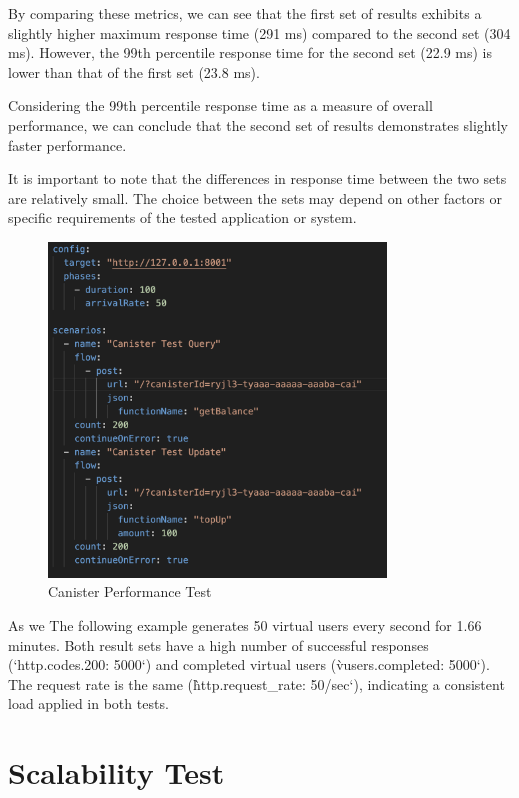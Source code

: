 By comparing these metrics, we can see that the first set of results exhibits a slightly higher maximum response time (291 ms) compared to the second set (304 ms). However, the 99th percentile response time for the second set (22.9 ms) is lower than that of the first set (23.8 ms).

Considering the 99th percentile response time as a measure of overall performance, we can conclude that the second set of results demonstrates slightly faster performance.

It is important to note that the differences in response time between the two sets are relatively small. The choice between the sets may depend on other factors or specific requirements of the tested application or system.


\begin{figure}[H]
    \centering
    \includegraphics[width=0.8\textwidth]{test.png}
    \caption{Canister Performance Test}
    \label{fig:Canister Test}
\end{figure}


As we The following example generates 50 virtual users every second for  1.66 minutes. Both result sets have a high number of successful responses (`http.codes.200: 5000`) and completed virtual users (\`vusers.completed: 5000`). The request rate is the same (\`http.request\_rate: 50/sec`), indicating a consistent load applied in both tests.

\section{Scalability Test}

